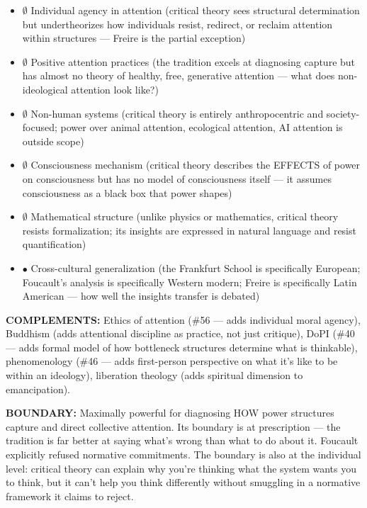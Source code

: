 \begin{itemize}[nosep,leftmargin=*]
  \item $\emptyset$ Individual agency in attention (critical theory sees structural determination but undertheorizes how individuals resist, redirect, or reclaim attention within structures — Freire is the partial exception)
  \item $\emptyset$ Positive attention practices (the tradition excels at diagnosing capture but has almost no theory of healthy, free, generative attention — what does non-ideological attention look like?)
  \item $\emptyset$ Non-human systems (critical theory is entirely anthropocentric and society-focused; power over animal attention, ecological attention, AI attention is outside scope)
  \item $\emptyset$ Consciousness mechanism (critical theory describes the EFFECTS of power on consciousness but has no model of consciousness itself — it assumes consciousness as a black box that power shapes)
  \item $\emptyset$ Mathematical structure (unlike physics or mathematics, critical theory resists formalization; its insights are expressed in natural language and resist quantification)
  \item $\bullet$ Cross-cultural generalization (the Frankfurt School is specifically European; Foucault's analysis is specifically Western modern; Freire is specifically Latin American — how well the insights transfer is debated)
\end{itemize}


\textbf{COMPLEMENTS:} Ethics of attention (\#56 — adds individual moral agency), Buddhism (adds attentional discipline as practice, not just critique), DoPI (\#40 — adds formal model of how bottleneck structures determine what is thinkable), phenomenology (\#46 — adds first-person perspective on what it's like to be within an ideology), liberation theology (adds spiritual dimension to emancipation).


\textbf{BOUNDARY:} Maximally powerful for diagnosing HOW power structures capture and direct collective attention. Its boundary is at prescription — the tradition is far better at saying what's wrong than what to do about it. Foucault explicitly refused normative commitments. The boundary is also at the individual level: critical theory can explain why you're thinking what the system wants you to think, but it can't help you think differently without smuggling in a normative framework it claims to reject.


